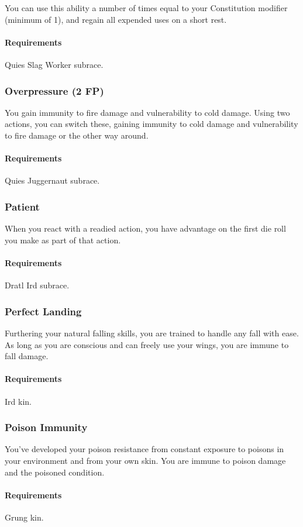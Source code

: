     You can use this ability a number of times equal to your Constitution modifier (minimum of 1), and regain all expended uses on a short rest.
    \paragraph{Requirements} Quies Slag Worker subrace.
\subsubsection{Overpressure (2 FP)} \label{feat::overpressure}
    You gain immunity to fire damage and vulnerability to cold damage.
    Using two actions, you can switch these, gaining immunity to cold damage and vulnerability to fire damage or the other way around.
    \paragraph{Requirements} Quies Juggernaut subrace.
\subsubsection{Patient} \label{feat::patient}
    When you react with a readied action, you have advantage on the first die roll you make as part of that action.
    \paragraph{Requirements} Dratl Ird subrace.
\subsubsection{Perfect Landing} \label{feat::perfectlanding}
    Furthering your natural falling skills, you are trained to handle any fall with ease.
    As long as you are conscious and can freely use your wings, you are immune to fall damage.
    \paragraph{Requirements} Ird kin.
\subsubsection{Poison Immunity} \label{feat::poisonimmunity}
    You've developed your poison resistance from constant exposure to poisons in your environment and from your own skin.
    You are immune to poison damage and the poisoned condition.
    \paragraph{Requirements} Grung kin.
